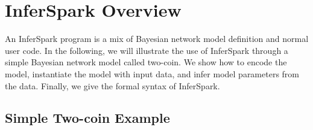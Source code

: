 \section{InferSpark Overview}
\label{sec:framework}



An InferSpark program is a mix of Bayesian network model definition and normal
user code. In the following, we will illustrate the use of InferSpark through a simple
Bayesian network model called two-coin.  We show how to encode the model, instantiate
the model with input data, and infer model parameters from the data.
Finally, we give the formal syntax of InferSpark.



\subsection{Simple Two-coin Example}

